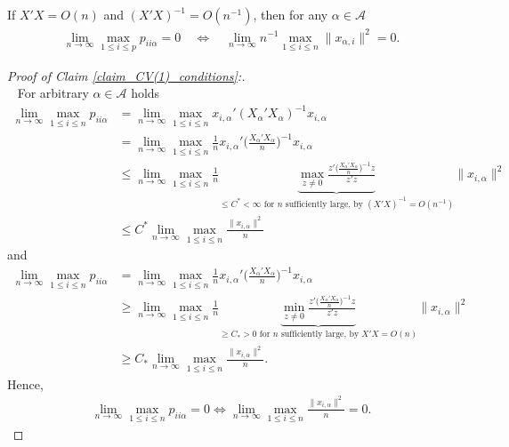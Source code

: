 \documentclass[Research_Module_ES.tex]{subfiles}
\begin{document}
\begin{claim}\label{claim_CV(1)_conditions}
	If $X'X=O(n)$ and $(X'X)^{-1}=O(n^{-1})$, then for any $\alpha \in \mathcal{A}$
	\begin{align*}
		\lim_{n\to \infty} \max_{1\le i \le p} p_{ii\alpha}=0  \quad \iff \quad 
		 \lim_{n\to \infty} n^{-1}\max_{1\le i \le n} \lVert x_{\alpha,i}\rVert ^2 = 0.
	\end{align*}
\end{claim}
\begin{proof}[Proof of Claim \ref{claim_CV(1)_conditions}:]~\\~
	For arbitrary $\alpha \in \mathcal{A}$ holds
	\begin{align*}
	\lim_{n\to\infty} \max_{1\le i\le n} p_{ii\alpha} &= \lim_{n\to\infty} \max_{1\le i\le n} x_{i,\alpha}'(X_\alpha'X_\alpha)^{-1} x_{i,\alpha} \\
	&= \lim_{n\to\infty} \max_{1\le i\le n} \frac{1}{n} x_{i,\alpha}'\biggl(\frac{X_\alpha'X_\alpha}{n}\biggr)^{-1} x_{i,\alpha} \\
	&\le \lim_{n\to\infty} \max_{1\le i\le n} \frac{1}{n} \underbrace{\max_{z\neq 0} \frac{z'\bigl(\frac{X_\alpha'X_\alpha}{n}\bigr)^{-1}z}{z'z}}_{\le C^\ast < \infty \textrm{ for $n$ sufficiently large, by $(X'X)^{-1}=O(n^{-1})$} }  \lVert x_{i,\alpha} \rVert ^2 \\
	&\le C^\ast \lim_{n\to \infty} \max_{1\le i \le n} \frac{\lVert x_{i,\alpha}\rVert ^2}{n}
	\end{align*}
	and 
	\begin{align*}
	\lim_{n\to \infty} \max_{1\le i \le n} p_{ii\alpha} &=  \lim_{n\to\infty} \max_{1\le i\le n} \frac{1}{n} x_{i,\alpha}'\biggl(\frac{X_\alpha'X_\alpha}{n}\biggr)^{-1} x_{i,\alpha} \\
	&\ge \lim_{n\to\infty} \max_{1\le i\le n} \frac{1}{n} \underbrace{\min_{z\neq 0} \frac{z'\bigl(\frac{X_\alpha'X_\alpha}{n}\bigr)^{-1}z}{z'z}}_{\ge C_\ast > 0 \textrm{ for $n$ sufficiently large, by $X'X=O(n)$}} \lVert x_{i,\alpha} \rVert ^2\\
	&\ge C_\ast \lim_{n\to\infty} \max_{1\le i\le n} \frac{\lVert x_{i,\alpha}\rVert^2}{n}.
	\end{align*}
	Hence, 
	\begin{align*}
	\lim_{n\to \infty} \max_{1\le i \le n} p_{ii\alpha} = 0 \iff \lim_{n\to\infty} \max_{1\le i\le n} \frac{\lVert x_{i,\alpha}\rVert^2}{n} = 0.
	\end{align*}
\end{proof}
\end{document}
